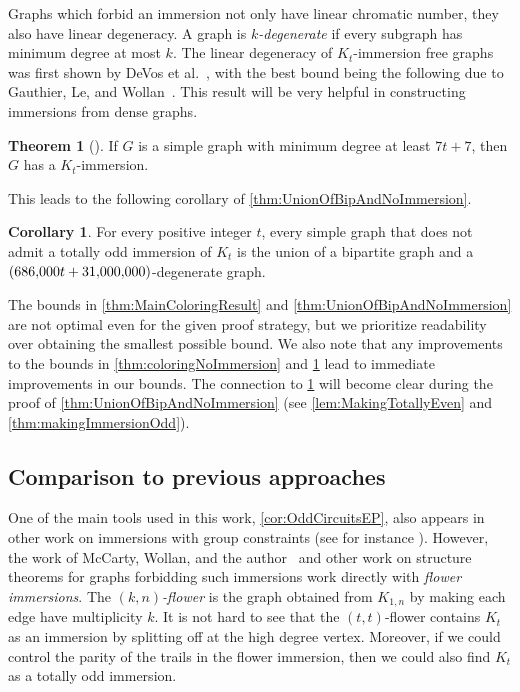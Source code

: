 \documentclass{article}
\theoremstyle{definition}
\newtheorem{corollary}[environment]{Corollary}
\newtheorem{theorem}[environment]{Theorem}
\begin{document}
 Graphs which forbid an immersion not only have linear chromatic number, they also have linear degeneracy. A graph is \emph{$k$-degenerate} if every subgraph has minimum degree at most $k$. The linear degeneracy of $K_t$-immersion free graphs was first shown by DeVos et al.~\cite{Devos2014Minimum}, with the best bound being the following due to Gauthier, Le, and Wollan~\cite{Gauthier2019Forcing}. This result will be very helpful in constructing immersions from dense graphs.

\begin{theorem}[{\cite[Theorem~1.4]{Gauthier2019Forcing}}]\label{thm:MinDegImmersion}
    If $G$ is a simple graph with minimum degree at least $7t+7$, then $G$ has a $K_t$-immersion.
\end{theorem}

This leads to the following corollary of \cref{thm:UnionOfBipAndNoImmersion}.

\begin{corollary}
    For every positive integer $t$, every simple graph that does not admit a totally odd immersion of $K_t$ is the union of a bipartite graph and a $(686{\small,}000t + 31{\small,}000{\small,}000)$-degenerate graph.
\end{corollary}

The bounds in \cref{thm:MainColoringResult} and \cref{thm:UnionOfBipAndNoImmersion} are not optimal even for the given proof strategy, but we prioritize readability over obtaining the smallest possible bound. We also note that any improvements to the bounds in \cref{thm:coloringNoImmersion} and \cref{thm:MinDegImmersion} lead to immediate improvements in our bounds. The connection to \cref{thm:MinDegImmersion} will become clear during the proof of \cref{thm:UnionOfBipAndNoImmersion} (see \cref{lem:MakingTotallyEven} and \cref{thm:makingImmersionOdd}).

\subsection{Comparison to previous approaches}\label{subsection:comparison}

One of the main tools used in this work, \cref{cor:OddCircuitsEP}, also appears in other work on immersions with group constraints (see for instance \cite[Corollary 3.2]{McCartyMW2026Structure}). However, the work of McCarty, Wollan, and the author~\cite{McCartyMW2026Structure} and other work on structure theorems for graphs forbidding such immersions \cite{Churchley2017Odd, WOLLAN2015} work directly with \emph{flower immersions}. The \emph{$(k,n)$-flower} is the graph obtained from $K_{1,n}$ by making each edge have multiplicity $k$. It is not hard to see that the $(t,t)$-flower contains $K_t$ as an immersion by splitting off at the high degree vertex. Moreover, if we could control the parity of the trails in the flower immersion, then we could also find $K_t$ as a totally odd immersion.
\end{document}
